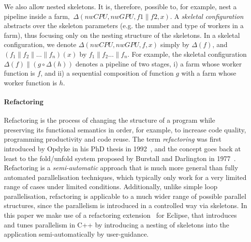 \documentclass[smallextended]{svjour3}
\begin{document}
\noindent
We also allow nested skeletons. It is, therefore, possible to, for example, nest a
pipeline inside a farm,\ $\Delta(nwCPU,nwGPU,f1 \parallel f2, x)$.
A \emph{skeletal configuration}  abstracts over the skeleton
parameters (e.g. the number and type of
workers in a farm), thus focusing only on the nesting structure of the
skeletons. In a skeletal configuration, we denote
$\Delta(\mathit{nwCPU},\mathit{nwGPU},f,x)$ simply by $\Delta(f)$, and $(f_1 \parallel
f_2 \parallel \dots \parallel f_n)(x)$ by $f_1 \parallel f_2
\dots \parallel f_n$. For example, the skeletal
configuration $\Delta(f) \parallel (g \circ \Delta(h))$
denotes a
pipeline of two stages, %
i) a farm whose worker function is $f$, and ii) a sequential composition of
function $g$ with a farm whose worker function is $h$. %
%

\paragraph{Refactoring}
Refactoring is the process of changing the structure of a program
while preserving its functional semantics in order, for example, 
to increase code quality, programming productivity and code reuse.
The term \emph{refactoring} was first introduced by Opdyke in his PhD
thesis in 1992~\cite{opdyke}, and the concept goes back at least to the fold/unfold system proposed
by Burstall and Darlington in 1977~\cite{darlington77}.
Refactoring is a \emph{semi-automatic} approach that is much more
general than fully automated parallelisation techniques, which typically
only work for a very limited range of cases under limited conditions.
Additionally, unlike simple loop parallelisation, refactoring is applicable
to a much wider range of possible parallel structures, since the parallelism is introduced
in a controlled way via skeletons.
In this paper we make use of a refactoring extension~\cite{pdp} for Eclipse, that introduces and tunes parallelism in C++ by introducing a nesting of skeletons into the application semi-automatically by user-guidance.
\end{document}
